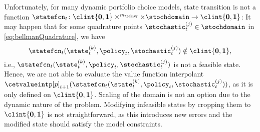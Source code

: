 Unfortunately, for many dynamic portfolio choice models,
state transition is not a function
$\statefcn_t\colon \clint{\*0, \*1} \times \real^{m_{\policy}} \times
\stochdomain \to \clint{\*0, \*1}$:
It may happen that for some quadrature points
$\stochastic_t^{(j)} \in \stochdomain$ in \eqref{eq:bellmanQuadrature},
we have
\begin{equation}
  \statefcn_t(\state_t^{(k)}, \policy_t, \stochastic_t^{(j)})
  \notin \clint{\*0, \*1},
\end{equation}
i.e., $\statefcn_t(\state_t^{(k)}, \policy_t, \stochastic_t^{(j)})$
is not a feasible state.
Hence, we are not able to evaluate the value function interpolant
$\cetvalueintp[p]_{t+1}(
  \statefcn_t(\state_t^{(k)}, \policy_t, \stochastic_t^{(j)})
)$, as it is only defined on $\clint{\*0, \*1}$.
Scaling of the domain is not an option due to the dynamic nature of
the problem.
Modifying infeasible states by cropping them to $\clint{\*0, \*1}$
is not straightforward, as this introduces new errors and
the modified state should satisfy the model constraints.

